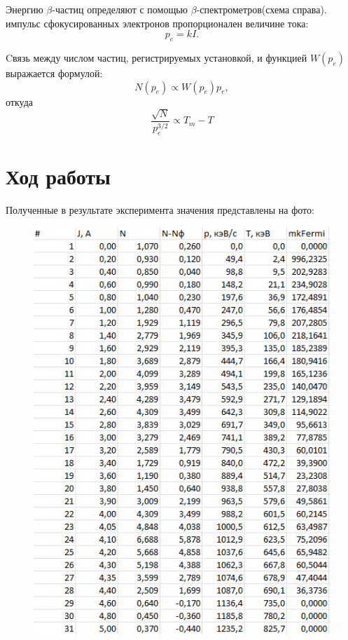 \documentclass[a4paper,12pt]{article}
\begin{document}
	Энергию $\beta$-частиц определяют с помощью $\beta$-спектрометров(схема справа). импульс сфокусированных электронов пропорционален величине тока:
	\begin{equation}
		\label{eq:pkI}
		p_e = kI.
	\end{equation}

	Cвязь между числом частиц, регистрируемых установкой, и функцией $W(p_e)$ выражается формулой:
	\begin{equation*}
		N(p_e) \propto W(p_e)p_e,
	\end{equation*}
	откуда
	\begin{equation}
		\label{eq:fermi}
		\frac{\sqrt{N}}{p_e^{3/2}} \propto T_m - T
	\end{equation}
\newpage
\section{Ход работы}
Полученные в результате эксперимента значения представлены на фото:
\begin{figure}[H]
\centering
\includegraphics[scale=1]{tabl1.png}
\end{figure}
\end{document}
